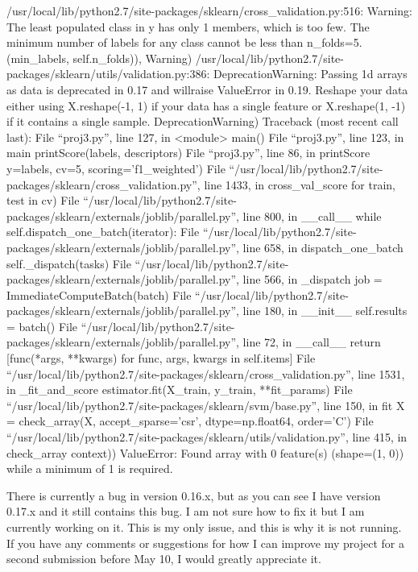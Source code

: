 \documentclass[a4paper, 11pt]{article}
\begin{document}
/usr/local/lib/python2.7/site-packages/sklearn/cross_validation.py:516: Warning: The least populated class in y has only 1 members, which is too few. The minimum number of labels for any class cannot be less than n_folds=5.
  (min_labels, self.n_folds)), Warning)
/usr/local/lib/python2.7/site-packages/sklearn/utils/validation.py:386: DeprecationWarning: Passing 1d arrays as data is deprecated in 0.17 and willraise ValueError in 0.19. Reshape your data either using X.reshape(-1, 1) if your data has a single feature or X.reshape(1, -1) if it contains a single sample.
  DeprecationWarning)
Traceback (most recent call last):
  File ``proj3.py'', line 127, in <module>
    main()
  File ``proj3.py'', line 123, in main
    printScore(labels, descriptors)
  File ``proj3.py'', line 86, in printScore
    y=labels, cv=5, scoring='f1_weighted') 
  File ``/usr/local/lib/python2.7/site-packages/sklearn/cross_validation.py'', line 1433, in cross_val_score
    for train, test in cv)
  File ``/usr/local/lib/python2.7/site-packages/sklearn/externals/joblib/parallel.py'', line 800, in __call__
    while self.dispatch_one_batch(iterator):
  File ``/usr/local/lib/python2.7/site-packages/sklearn/externals/joblib/parallel.py'', line 658, in dispatch_one_batch
    self._dispatch(tasks)
  File ``/usr/local/lib/python2.7/site-packages/sklearn/externals/joblib/parallel.py'', line 566, in _dispatch
    job = ImmediateComputeBatch(batch)
  File ``/usr/local/lib/python2.7/site-packages/sklearn/externals/joblib/parallel.py'', line 180, in __init__
    self.results = batch()
  File ``/usr/local/lib/python2.7/site-packages/sklearn/externals/joblib/parallel.py'', line 72, in __call__
    return [func(*args, **kwargs) for func, args, kwargs in self.items]
  File ``/usr/local/lib/python2.7/site-packages/sklearn/cross_validation.py'', line 1531, in _fit_and_score
    estimator.fit(X_train, y_train, **fit_params)
  File ``/usr/local/lib/python2.7/site-packages/sklearn/svm/base.py'', line 150, in fit
    X = check_array(X, accept_sparse='csr', dtype=np.float64, order='C')
  File ``/usr/local/lib/python2.7/site-packages/sklearn/utils/validation.py'', line 415, in check_array
    context))
ValueError: Found array with 0 feature(s) (shape=(1, 0)) while a minimum of 1 is required.

There is currently a bug in version 0.16.x, but as you can see I have version 0.17.x and it still contains this bug. I am not sure how to fix it but I am currently working on it. This is my only issue, and this is why it is not running. If you have any comments or suggestions for how I can improve my project for a second submission before May 10, I would greatly appreciate it.
\end{document}
